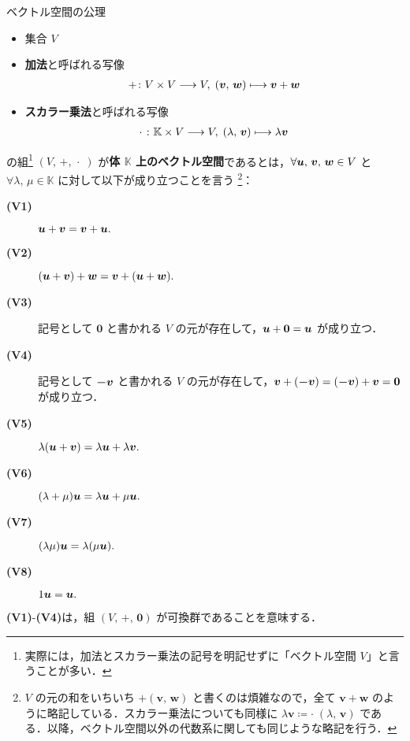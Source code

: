 \documentclass[geometry_main]{subfiles}
\begin{document}
\begin{myaxiom}[label=ax.vector, breakable]{ベクトル空間の公理}
	\begin{itemize}
		\item 集合 $V$ 
		\item \textbf{加法}と呼ばれる写像
		\begin{align}
			+ \colon V \times V \longrightarrow V,\; (\bm{v},\, \bm{w}) \longmapsto \bm{v} + \bm{w}
		\end{align}
		
		\item \textbf{スカラー乗法}と呼ばれる写像
		\begin{align}
			\cdot\; \colon \mathbb{K} \times V \longrightarrow V,\; (\lambda,\, \bm{v}) \longmapsto \lambda \bm{v}
		\end{align}
		
	\end{itemize}
	の組\footnote{実際には，加法とスカラー乗法の記号を明記せずに「ベクトル空間 $V$」と言うことが多い．} $(V,\, +,\, \cdot\;)$ が\textbf{体 $\mathbb{K}$ 上のベクトル空間}であるとは，$\forall \vb*{u},\, \vb*{v},\, \vb*{w} \in V$ と$ \forall \lambda,\, \mu \in \mathbb{K}$ に対して以下が成り立つことを言う
	\footnote{$V$ の元の和をいちいち $+(\bm{v},\, \bm{w})$ と書くのは煩雑なので，全て $\bm{v} + \bm{w}$ のように略記している．スカラー乗法についても同様に $\lambda \bm{v} \coloneqq \cdot\; (\lambda,\, \bm{v})$ である．以降，ベクトル空間以外の代数系に関しても同じような略記を行う．}：
	\begin{description}
		\item[\textbf{(V1)}] $\vb*{u} + \vb*{v} = \vb*{v} + \vb*{u}.$
		\item[\textbf{(V2)}] $(\vb*{u} + \vb*{v}) + \vb*{w} = \vb*{v} + (\vb*{u} + \vb*{w}).$
		\item[\textbf{(V3)}] 記号として $\bm{0}$ と書かれる $V$ の元が存在して，$\vb*{u} + \vb*{0} = \vb*{u}$ が成り立つ．
		\item[\textbf{(V4)}] 記号として $\vb*{-v}$ と書かれる $V$ の元が存在して，$\vb*{v} + (\vb*{-v}) = (\vb*{-v}) + \vb*{v} = \vb*{0}$ が成り立つ．
		\item[\textbf{(V5)}] $\lambda (\vb*{u} + \vb*{v}) = \lambda \vb*{u} + \lambda \vb*{v}.$
		\item[\textbf{(V6)}] $(\lambda + \mu) \vb*{u} = \lambda \vb*{u} + \mu \vb*{u}.$
		\item[\textbf{(V7)}] $(\lambda\mu)\vb*{u} = \lambda (\mu \vb*{u}).$
		\item[\textbf{(V8)}] $1 \vb*{u} = \vb*{u}.$
	\end{description}
\end{myaxiom}
\textbf{\textsf{(V1)}}-\textbf{\textsf{(V4)}}は，組 $(V,\, +,\, \bm{0})$ が可換群であることを意味する．
\end{document}

